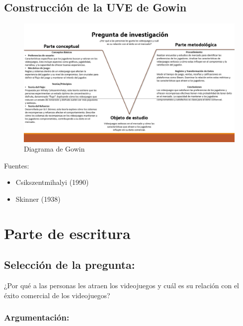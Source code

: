\documentclass[
  letterpaper,
  DIV=11,
  numbers=noendperiod]{scrreprt}
\begin{document}
\section{Construcción de la UVE de
Gowin}\label{construcciuxf3n-de-la-uve-de-gowin}

\begin{figure}[H]

{\centering \includegraphics{imagenes/V-de-gowin.png}

}

\caption{Diagrama de Gowin}

\end{figure}%

Fuentes:

\begin{itemize}
\item
  Csikszentmihalyi (1990)
\item
  Skinner (1938)
\end{itemize}


\chapter{Parte de escritura}\label{parte-de-escritura}

\section{Selección de la pregunta:}\label{selecciuxf3n-de-la-pregunta}

¿Por qué a las personas les atraen los videojuegos y cuál es su relación
con el éxito comercial de los videojuegos?

\subsection{Argumentación:}\label{argumentaciuxf3n}
\end{document}
